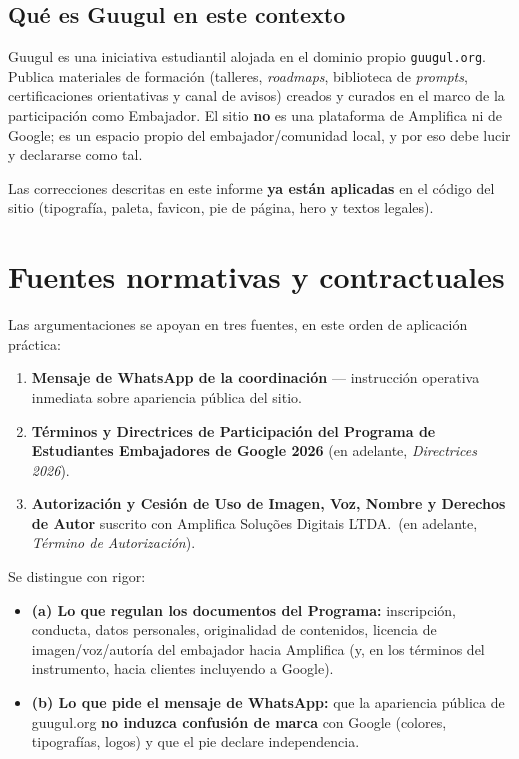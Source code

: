 \documentclass[11pt,a4paper]{article}
\begin{document}
\subsection{Qué es Guugul en este contexto}

Guugul es una iniciativa estudiantil alojada en el dominio propio \texttt{guugul.org}. Publica materiales de formación (talleres, \emph{roadmaps}, biblioteca de \emph{prompts}, certificaciones orientativas y canal de avisos) creados y curados en el marco de la participación como Embajador. El sitio \textbf{no} es una plataforma de Amplifica ni de Google; es un espacio propio del embajador/comunidad local, y por eso debe lucir y declararse como tal.

Las correcciones descritas en este informe \textbf{ya están aplicadas} en el código del sitio (tipografía, paleta, favicon, pie de página, hero y textos legales).

\section{Fuentes normativas y contractuales}

Las argumentaciones se apoyan en tres fuentes, en este orden de aplicación práctica:

\begin{enumerate}[leftmargin=*]
  \item \textbf{Mensaje de WhatsApp de la coordinación} --- instrucción operativa inmediata sobre apariencia pública del sitio.
  \item \textbf{Términos y Directrices de Participación del Programa de Estudiantes Embajadores de Google 2026} (en adelante, \emph{Directrices 2026}).
  \item \textbf{Autorización y Cesión de Uso de Imagen, Voz, Nombre y Derechos de Autor} suscrito con Amplifica Soluções Digitais LTDA.\ (en adelante, \emph{Término de Autorización}).
\end{enumerate}

Se distingue con rigor:

\begin{itemize}[leftmargin=*]
  \item \textbf{(a) Lo que regulan los documentos del Programa:} inscripción, conducta, datos personales, originalidad de contenidos, licencia de imagen/voz/autoría del embajador hacia Amplifica (y, en los términos del instrumento, hacia clientes incluyendo a Google).
  \item \textbf{(b) Lo que pide el mensaje de WhatsApp:} que la apariencia pública de guugul.org \textbf{no induzca confusión de marca} con Google (colores, tipografías, logos) y que el pie declare independencia.
\end{itemize}
\end{document}
